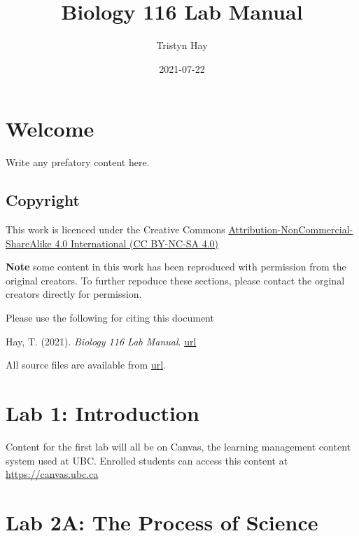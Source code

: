 \documentclass[
]{book}
\title{Biology 116 Lab Manual}
\author{Tristyn Hay}
\date{2021-07-22}
\begin{document}
\maketitle

{
\setcounter{tocdepth}{1}
\tableofcontents
}
\hypertarget{welcome}{%
\chapter*{Welcome}\label{welcome}}

Write any prefatory content here.

\hypertarget{copyright}{%
\section*{Copyright}\label{copyright}}

This work is licenced under the Creative Commons \href{https://creativecommons.org/licenses/by-nc-sa/4.0/}{Attribution-NonCommercial-ShareAlike 4.0 International (CC BY-NC-SA 4.0)}

\textbf{Note} some content in this work has been reproduced with permission from the original creators. To further repoduce these sections, please contact the orginal creators directly for permission.

Please use the following for citing this document

Hay, T. (2021). \emph{Biology 116 Lab Manual}. \href{}{url}

All source files are available from \href{}{url}.

\hypertarget{lab-1-introduction}{%
\chapter*{Lab 1: Introduction}\label{lab-1-introduction}}

Content for the first lab will all be on Canvas, the learning management content system used at UBC. Enrolled students can access this content at \url{https://canvas.ubc.ca}

\hypertarget{lab-2a-the-process-of-science}{%
\chapter*{Lab 2A: The Process of Science}\label{lab-2a-the-process-of-science}}
\end{document}
